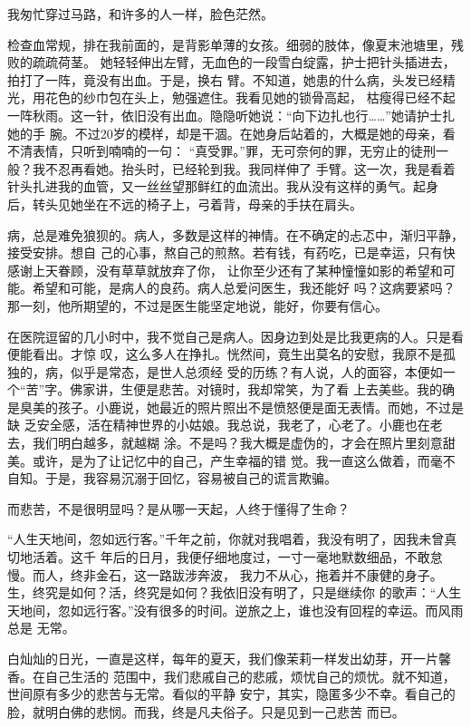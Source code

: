 		我匆忙穿过马路，和许多的人一样，脸色茫然。

		检查血常规，排在我前面的，是背影单薄的女孩。细弱的肢体，像夏末池塘里，残败的疏疏荷茎。
	她轻轻伸出左臂，无血色的一段雪白绽露，护士把针头插进去，拍打了一阵，竟没有出血。于是，换右
	臂。不知道，她患的什么病，头发已经精光，用花色的纱巾包在头上，勉强遮住。我看见她的锁骨高起，
	枯瘦得已经不起一阵秋雨。这一针，依旧没有出血。隐隐听她说：“向下边扎也行……”她请护士扎她的手
	腕。不过20岁的模样，却是干涸。在她身后站着的，大概是她的母亲，看不清表情，只听到喃喃的一句：
	“真受罪。”罪，无可奈何的罪，无穷止的徒刑一般？我不忍再看她。抬头时，已经轮到我。我同样伸了
	手臂。这一次，我是看着针头扎进我的血管，又一丝丝望那鲜红的血流出。我从没有这样的勇气。起身
	后，转头见她坐在不远的椅子上，弓着背，母亲的手扶在肩头。

		病，总是难免狼狈的。病人，多数是这样的神情。在不确定的忐忑中，渐归平静，接受安排。想自
	己的心事，熬自己的煎熬。若有钱，有药吃，已是幸运，只有快感谢上天眷顾，没有草草就放弃了你，
	让你至少还有了某种憧憧如影的希望和可能。希望和可能，是病人的良药。病人总爱问医生，我还能好
	吗？这病要紧吗？那一刻，他所期望的，不过是医生能坚定地说，能好，你要有信心。

		在医院逗留的几小时中，我不觉自己是病人。因身边到处是比我更病的人。只是看便能看出。才惊
	叹，这么多人在挣扎。恍然间，竟生出莫名的安慰，我原不是孤独的，病，似乎是常态，是世人总须经
	受的历练？有人说，人的面容，本便如一个“苦”字。佛家讲，生便是悲苦。对镜时，我却常笑，为了看
	上去美些。我的确是臭美的孩子。小鹿说，她最近的照片照出不是愤怒便是面无表情。而她，不过是缺
	乏安全感，活在精神世界的小姑娘。我总说，我老了，心老了。小鹿也在老去，我们明白越多，就越糊
	涂。不是吗？我大概是虚伪的，才会在照片里刻意甜美。或许，是为了让记忆中的自己，产生幸福的错
	觉。我一直这么做着，而毫不自知。于是，我容易沉溺于回忆，容易被自己的谎言欺骗。

		而悲苦，不是很明显吗？是从哪一天起，人终于懂得了生命？

		“人生天地间，忽如远行客。”千年之前，你就对我唱着，我没有明了，因我未曾真切地活着。这千
	年后的日月，我便仔细地度过，一寸一毫地默数细品，不敢怠慢。而人，终非金石，这一路跋涉奔波，
	我力不从心，拖着并不康健的身子。生，终究是如何？活，终究是如何？我依旧没有明了，只是继续你
	的歌声：“人生天地间，忽如远行客。”没有很多的时间。逆旅之上，谁也没有回程的幸运。而风雨总是
	无常。

		白灿灿的日光，一直是这样，每年的夏天，我们像茉莉一样发出幼芽，开一片馨香。在自己生活的
	范围中，我们悲戚自己的悲戚，烦忧自己的烦忧。就不知道，世间原有多少的悲苦与无常。看似的平静
	安宁，其实，隐匿多少不幸。看自己的脸，就明白佛的悲悯。而我，终是凡夫俗子。只是见到一己悲苦
	而已。

